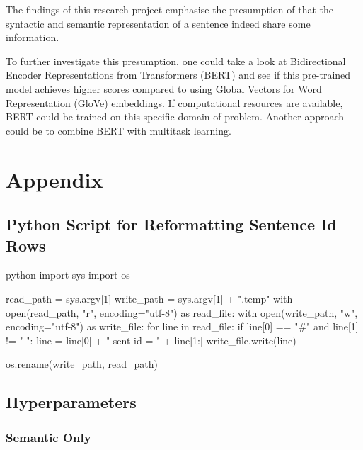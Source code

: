\documentclass[11pt]{scrartcl}
\begin{document}
The findings of this research project emphasise the presumption of \cite{kurtz-etal-2019-improving} that the syntactic and semantic representation of a sentence indeed share some information.

To further investigate this presumption, one could take a look at Bidirectional Encoder Representations from Transformers (BERT) and see if this pre-trained model achieves higher scores compared to using Global Vectors for Word Representation (GloVe) embeddings. If computational resources are available, BERT could be trained on this specific domain of problem. Another approach could be to combine BERT with multitask learning.

\clearpage

\printbibliography

\clearpage

\section{Appendix}

\subsection{Python Script for Reformatting Sentence Id Rows}
\label{sec:python_script_sentence_ids}

\begin{mintedbox}{python}
import sys
import os

read_path = sys.argv[1]
write_path = sys.argv[1] + ".temp"
with open(read_path, "r", encoding="utf-8") as read_file:
    with open(write_path, "w", encoding="utf-8") as write_file:
        for line in read_file:
            if line[0] == "#" and line[1] != " ":
                line = line[0] + " sent-id = " + line[1:]
            write_file.write(line)

os.rename(write_path, read_path)

\end{mintedbox}

\subsection{Hyperparameters}
\label{sec:hyperparameters}

\subsubsection{Semantic Only}
\end{document}
